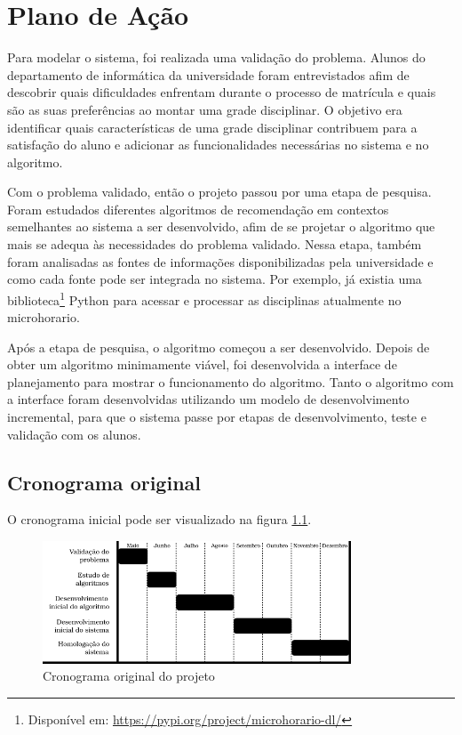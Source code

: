 
\chapter{Plano de Ação}
\label{cha:Plano de Ação}

Para modelar o sistema, foi realizada uma validação do problema. Alunos do departamento de informática da universidade foram entrevistados afim de descobrir quais dificuldades enfrentam durante o processo de matrícula e quais são as suas preferências ao montar uma grade disciplinar. O objetivo era identificar quais características de uma grade disciplinar contribuem para a satisfação do aluno e adicionar as funcionalidades necessárias no sistema e no algoritmo.

Com o problema validado, então o projeto passou por uma etapa de pesquisa. 
Foram estudados diferentes algoritmos de recomendação em contextos semelhantes ao sistema a ser desenvolvido, afim de se projetar o algoritmo que mais se adequa às necessidades do problema validado. 
Nessa etapa, também foram analisadas as fontes de informações disponibilizadas pela universidade e como cada fonte pode ser integrada no sistema. 
Por exemplo, já existia uma biblioteca\footnote{Dispon\'ivel em: \url{https://pypi.org/project/microhorario-dl/}} Python para acessar e processar as disciplinas atualmente no microhorario.

Após a etapa de pesquisa, o algoritmo começou a ser desenvolvido. 
Depois de obter um algoritmo minimamente viável, foi desenvolvida a interface de planejamento para mostrar o funcionamento do algoritmo. 
Tanto o algoritmo com a interface foram desenvolvidas utilizando um modelo de desenvolvimento incremental, para que o sistema passe por etapas de desenvolvimento, teste e validação com os alunos. 

\section{Cronograma original}

O cronograma inicial pode ser visualizado na figura \ref{fig-cronograma}.

\begin{figure}[ht!]
    \begin{center}
    \includegraphics[width=260pt]{figuras/cronograma}
    \caption{Cronograma original do projeto}
    \label{fig-cronograma}
    \end{center}
\end{figure}

